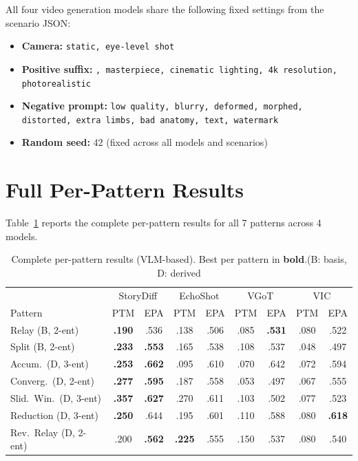 \documentclass[sigconf,review,anonymous]{acmart}
\begin{document}
All four video generation models share the following fixed settings from the scenario JSON:
\begin{itemize}[nosep,leftmargin=*]
\item \textbf{Camera:} \texttt{static, eye-level shot}
\item \textbf{Positive suffix:} \texttt{, masterpiece, cinematic lighting, 4k resolution, photorealistic}
\item \textbf{Negative prompt:} \texttt{low quality, blurry, deformed, morphed, distorted, extra limbs, bad anatomy, text, watermark}
\item \textbf{Random seed:} 42 (fixed across all models and scenarios)
\end{itemize}


\section{Full Per-Pattern Results}
\label{app:per_pattern}


Table~\ref{tab:full_pattern} reports the complete per-pattern results for all 7 patterns across 4 models.
\begin{table}[H]
\caption{Complete per-pattern results (VLM-based). Best per pattern in \textbf{bold}.(B: basis, D: derived}
\label{tab:full_pattern}
\centering
\small
\setlength{\tabcolsep}{2pt}
\begin{tabular}{@{}l|cc|cc|cc|cc@{}}
\toprule
& \multicolumn{2}{c|}{StoryDiff} & \multicolumn{2}{c|}{EchoShot} & \multicolumn{2}{c|}{VGoT} & \multicolumn{2}{c}{VIC} \\
Pattern & PTM & EPA & PTM & EPA & PTM & EPA & PTM & EPA \\
\midrule
Relay (B, 2-ent)       & \textbf{.190} & .536 & .138 & .506 & .085 & \textbf{.531} & .080 & .522 \\
Split (B, 2-ent)       & \textbf{.233} & \textbf{.553} & .165 & .538 & .108 & .537 & .048 & .497 \\
Accum.\ (D, 3-ent)    & \textbf{.253} & \textbf{.662} & .095 & .610 & .070 & .642 & .072 & .594 \\
Converg.\ (D, 2-ent)  & \textbf{.277} & \textbf{.595} & .187 & .558 & .053 & .497 & .067 & .555 \\
Slid.\ Win.\ (D, 3-ent) & \textbf{.357} & \textbf{.627} & .270 & .611 & .103 & .502 & .077 & .523 \\
Reduction (D, 3-ent)   & \textbf{.250} & .644 & .195 & .601 & .110 & .588 & .080 & \textbf{.618} \\
Rev.\ Relay (D, 2-ent) & .200 & \textbf{.562} & \textbf{.225} & .555 & .150 & .537 & .080 & .540 \\
\bottomrule
\end{tabular}
\end{table}
\end{document}
